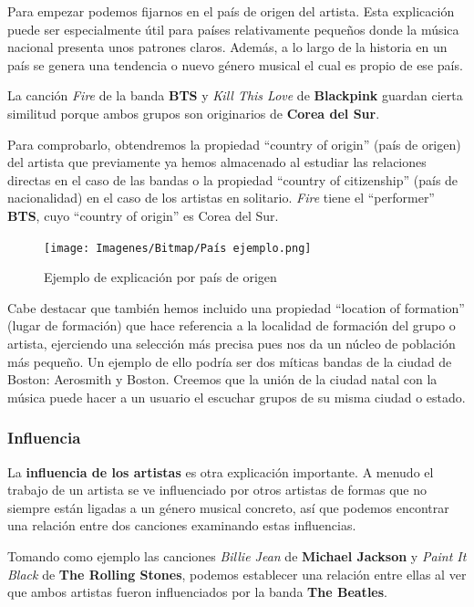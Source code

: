Para empezar podemos fijarnos en el país de origen del artista. Esta explicación puede ser especialmente útil para países relativamente pequeños donde la música nacional presenta unos patrones claros. Además, a lo largo de la historia en un país se genera una tendencia o nuevo género musical el cual es propio de ese país.

La canción \textit{Fire} de la banda \textbf{BTS} y \textit{Kill This Love} de \textbf{Blackpink} guardan cierta similitud porque ambos grupos son originarios de \textbf{Corea del Sur}.

Para comprobarlo, obtendremos la propiedad ``country of origin'' (país de origen) del artista que previamente ya hemos almacenado al estudiar las relaciones directas en el caso de las bandas o la propiedad ``country of citizenship'' (país de nacionalidad) en el caso de los artistas en solitario. \textit{Fire} tiene el ``performer'' \textbf{BTS}, cuyo ``country of origin'' es Corea del Sur.

\begin{figure}[h!]
	\centering
	\texttt{[image: Imagenes/Bitmap/País ejemplo.png]}
	\caption{Ejemplo de explicación por país de origen}
	\label{fig:sampleImage}
\end{figure}

Cabe destacar que también hemos incluido una propiedad ``location of formation'' (lugar de formación) que hace referencia a la localidad de formación del grupo o artista, ejerciendo una selección más precisa pues nos da un núcleo de población más pequeño. Un ejemplo de ello podría ser dos míticas bandas de la ciudad de Boston: Aerosmith y Boston. Creemos que la unión de la ciudad natal con la música puede hacer a un usuario el escuchar grupos de su misma ciudad o estado.


\subsubsection*{Influencia}

La \textbf{influencia de los artistas} es otra explicación importante. A menudo el trabajo de un artista se ve influenciado por otros artistas de formas que no siempre están ligadas a un género musical concreto, así que podemos encontrar una relación entre dos canciones examinando estas influencias.

Tomando como ejemplo las canciones \textit{Billie Jean} de \textbf{Michael Jackson} y \textit{Paint It Black} de \textbf{The Rolling Stones}, podemos establecer una relación entre ellas al ver que ambos artistas fueron influenciados por la banda \textbf{The Beatles}.

